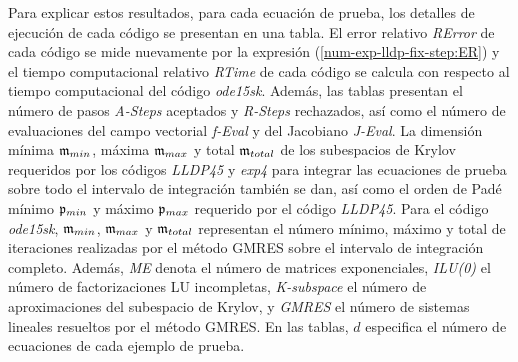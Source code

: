 Para explicar estos resultados, para cada ecuación de prueba, los detalles de ejecución de cada código se presentan en una tabla. El error relativo \textit{RError} de cada código se mide nuevamente por la expresión (\ref{num-exp-lldp-fix-step:ER}) y el tiempo computacional relativo \textit{RTime} de cada código se calcula con respecto al tiempo computacional del código \emph{ode15sk}. Además, las tablas presentan el número de pasos \textit{A-Steps} aceptados y \textit{R-Steps} rechazados, así como el número de evaluaciones del campo vectorial \textit{f-Eval} y del Jacobiano \textit{J-Eval}. La dimensión mínima $\mathfrak{m}_ {min}$, máxima $\mathfrak{m}_ {max}$ y total $\mathfrak{m}_{total}$ de los subespacios de Krylov requeridos por los códigos \emph{LLDP45} y \emph{exp4} para integrar las ecuaciones de prueba sobre todo el intervalo de integración  también se dan, así como el orden de Padé mínimo $\mathfrak{p}_{min}$ y máximo $\mathfrak{p}_{max}$ requerido por el código \emph{LLDP45}. Para el código \emph{ode15sk}, $\mathfrak{m}_{min}$, $\mathfrak{m}_{max}$ y $\mathfrak{m}_{total}$ representan el número mínimo, máximo y total de iteraciones realizadas por el método GMRES sobre el intervalo de integración completo. Además, \textit{ME} denota el número de matrices exponenciales, \textit{ILU(0)} el número de factorizaciones LU incompletas, \textit{K-subspace} el número de aproximaciones del subespacio de Krylov, y \textit{GMRES} el número de sistemas lineales resueltos por el método GMRES. En las tablas, $d$ especifica el número de ecuaciones de cada ejemplo de prueba.

